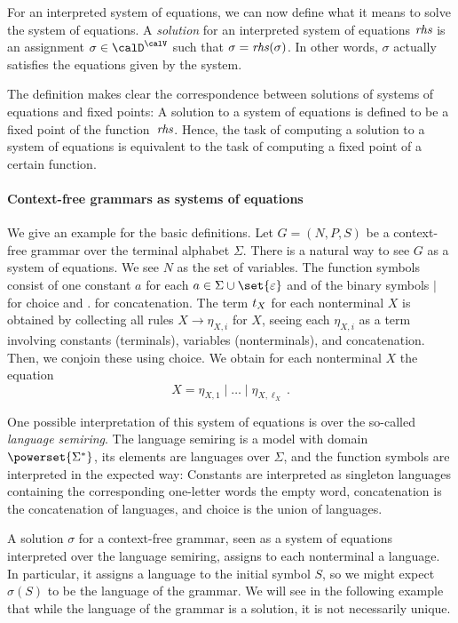 \documentclass[../../diss.tex]{subfiles}
\begin{document}
For an interpreted system of equations, we can now define what it means to solve the system of equations.
A \emph{solution} for an interpreted system of equations $\mathit{rhs}$ is an assignment $\sigma \in \domain^\vars$ such that $\sigma = \mathit{rhs}(\sigma)$.
In other words, $\sigma$ actually satisfies the equations given by the system.

The definition makes clear the correspondence between solutions of systems of equations and fixed points:
A solution to a system of equations is defined to be a fixed point of the function~$\mathit{rhs}$.
Hence, the task of computing a solution to a system of equations is equivalent to the task of computing a fixed point of a certain function.

\paragraph{Context-free grammars as systems of equations}

We give an example for the basic definitions.
Let $G = (N,P,S)$ be a context-free grammar over the terminal alphabet $\Sigma$.
There is a natural way to see $G$ as a system of equations.
We see $N$ as the set of variables.
The function symbols consist of one constant $a$ for each $a \in \Sigma \cup \set{\eps}$ and of the binary symbols $\mid$ for choice and $.$ for concatenation.
The term $t_X$ for each nonterminal $X$ is obtained by collecting all rules $X \to \eta_{X,i}$ for $X$, seeing each $\eta_{X,i}$ as a term involving constants (terminals), variables (nonterminals), and concatenation.
Then, we conjoin these using choice.
We obtain for each nonterminal $X$ the equation
\[
    X = \eta_{X,1} \mid \ldots \mid \eta_{X,\ell_X}
    \ .
\]

One possible interpretation of this system of equations is over the so-called \emph{language semi\-ring}.
The language semiring is a model with domain $\powerset{\Sigma^*}$, \ie its elements are languages over $\Sigma$, and the function symbols are interpreted in the expected way: Constants are interpreted as singleton languages containing the corresponding one-letter words \resp the empty word, concatenation is the concatenation of languages, and choice is the union of languages.

A solution $\sigma$ for a context-free grammar, seen as a system of equations interpreted over the language semiring, assigns to each nonterminal a language.
In particular, it assigns a language to the initial symbol $S$, so we might expect $\sigma(S)$ to be the language of the grammar.
We will see in the following example that while the language of the grammar is a solution, it is not necessarily unique.
\end{document}
